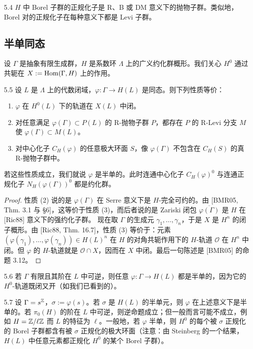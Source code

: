 \begin{exam}{5.4}
$H$ 中 Borel 子群的正规化子是 R、B 或 DM 意义下的抛物子群。类似地，Borel 对的正规化子在每种意义下都是 Levi 子群。
\end{exam}

\subsection{半单同态}
设 $\Gamma$ 是抽象有限生成群，$H$ 是系数环 $\Lambda$ 上的广义约化群概形。我们关心 $H^0$ 通过共轭在 $X:=\operatorname{Hom}(\Gamma,H)$ 上的作用。

\begin{thm}{5.5}\label{thm:dat-5-5}
设 $L$ 是 $\Lambda$ 上的代数闭域，$\varphi:\Gamma\to H(L)$ 是同态。则下列性质等价：
\begin{enumerate}[leftmargin=2.2em,itemsep=0.1em,topsep=0.2em]
\item $\varphi$ 在 $H^0(L)$ 下的轨道在 $X(L)$ 中闭。
\item 对任意满足 $\varphi(\Gamma)\subset P(L)$ 的 R-抛物子群 $P$，都存在 $P$ 的 R-Levi 分支 $M$ 使 $\varphi(\Gamma)\subset M(L)$。
\item 对中心化子 $C_H(\varphi)$ 的任意极大环面 $S$，像 $\varphi(\Gamma)$ 不包含在 $C_H(S)$ 的真 R-抛物子群中。
\end{enumerate}
若这些性质成立，我们就说 $\varphi$ 是半单的。此时连通中心化子 $C_H(\varphi)^0$ 与连通正规化子 $N_H(\varphi(\Gamma))^0$ 都是约化群。
\end{thm}

\begin{proof}
性质 (2) 说的是 $\varphi(\Gamma)$ 在 Serre 意义下是 $H$-完全可约的。由 [BMR05, Thm. 3.1 与 \S6]，这等价于性质 (3)，而后者说的是 Zariski 闭包 $\overline{\varphi(\Gamma)}$ 是 $H$ 在 [Ric88] 意义下的强约化子群。
现在取 $\Gamma$ 的生成元 $\gamma_1,\dots,\gamma_n$，于是 $X$ 是 $H^n$ 的闭子概形。由 [Ric88, Thm. 16.7]，性质 (3) 等价于：元素 $(\varphi(\gamma_1),\dots,\varphi(\gamma_n))\in H(L)^n$ 在 $H$ 的对角共轭作用下的 $H$-轨道 $\mathcal O$ 在 $H^n$ 中闭。但 $\varphi$ 的 $H$-轨道就是 $\mathcal O\cap X$，因而在 $X$ 中闭。最后一句陈述是 [BMR05] 的命题 3.12。
\end{proof}

\begin{exam}{5.6}
若 $\Gamma$ 有限且其阶在 $L$ 中可逆，则任意 $\varphi:\Gamma\to H(L)$ 都是半单的，因为它的 $H^0$-轨道既闭又开（如我们已看到的）。
\end{exam}

\begin{exam}{5.7}
设 $\Gamma=s^{\mathbb{Z}}$，$\sigma:=\varphi(s)$。若 $\sigma$ 是 $H(L)$ 的半单元，则 $\varphi$ 在上述意义下是半单的。若 $\pi_0(H)$ 的阶在 $L$ 中可逆，则逆命题成立；但一般而言可能不成立，例如 $H=\mathbb{Z}/\ell\mathbb{Z}$ 而 $L$ 的特征为 $\ell$。一般地，若 $\varphi$ 半单，则 $H^0$ 的每个被 $\sigma$ 正规化的 Borel 子群都含有被 $\sigma$ 正规化的极大环面（注意：由 Steinberg 的一个结果，$H(L)$ 中任意元素都正规化 $H^0$ 的某个 Borel 子群）。
\end{exam}

